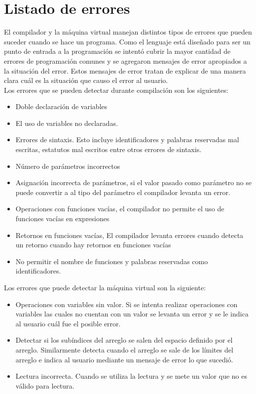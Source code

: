 \section{Listado de errores}
El compilador y la máquina virtual manejan distintos tipos de errores que pueden suceder cuando se hace un programa. Como el lenguaje está diseñado para ser un punto de entrada a la programación se intentó cubrir la mayor cantidad de errores de programación comunes y se agregaron mensajes de error apropiados a la situación del error. Estos mensajes de error tratan de explicar de una manera clara cuál es la situación que causo el error al usuario.\\

Los errores que se pueden detectar durante compilación son los siguientes:
\begin{itemize}
    \item Doble declaración de variables
    \item El uso de variables no declaradas.
    \item Errores de sintaxis. Esto incluye identificadores y palabras reservadas mal escritas, estatutos mal escritos entre otros errores de sintaxis.
    \item Número de parámetros incorrectos
    \item Asignación incorrecta de parámetros, si el valor pasado como parámetro no se puede convertir a al tipo del parámetro el compilador levanta un error.
    \item Operaciones con funciones vacías, el compilador no permite el uso de funciones vacías en expresiones
    \item Retornos en funciones vacías, El compilador levanta errores cuando detecta un retorno cuando hay retornos en funciones vacías
    \item No permitir el nombre de funciones y palabras reservadas como identificadores.
\end{itemize}

Los errores que puede detectar la máquina virtual son la siguiente:
\begin{itemize}
    \item Operaciones con variables sin valor. Si se intenta realizar operaciones con variables las cuales no cuentan con un valor se levanta un error y se le indica al usuario cuál fue el posible error.
    \item Detectar si los subíndices del arreglo se salen del espacio definido por el arreglo. Similarmente detecta cuando el arreglo se sale de los límites del arreglo e indica al usuario mediante un mensaje de error lo que sucedió.
    \item Lectura incorrecta. Cuando se utiliza la lectura y se mete un valor que no es válido para lectura.
\end{itemize}


